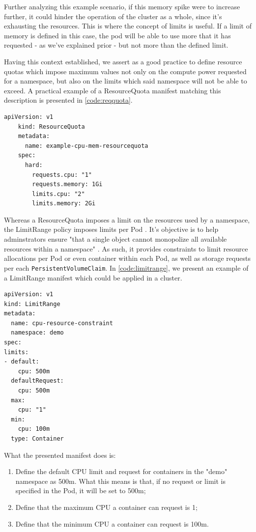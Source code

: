 \documentclass[a4paper,11pt,openright,BCOR=15mm]{scrbook}
\begin{document}
Further analyzing this example scenario, if this memory spike were to increase further, it could hinder the operation of the cluster as a whole, since it's exhausting the resources. This is where the concept of limits is useful. If a limit of memory is defined in this case, the pod will be able to use more that it has requested - as we've explained prior - but not more than the defined limit.

Having this context established, we assert as a good practice to define resource quotas which impose maximum values not only on the compute power requested for a namespace, but also on the limits which said namespace will not be able to exceed. A practical example of a ResourceQuota manifest matching this description is presented in \ref{code:reqquota}.

\begin{lstlisting}[style=yaml,caption={ResourceQuota example},label=code:reqquota]
	apiVersion: v1
	kind: ResourceQuota
	metadata:
	  name: example-cpu-mem-resourcequota
	spec:
	  hard:
	    requests.cpu: "1"
		requests.memory: 1Gi
		limits.cpu: "2"
		limits.memory: 2Gi
\end{lstlisting}


Whereas a ResourceQuota imposes a limit on the resources used by a namespace, the LimitRange policy imposes limits per Pod \cite{national_security_agency_kubernetes_2022}. It's objective is to help adminstrators ensure "that a single object cannot monopolize all available resources within a namespace" \cite{the_linux_foundation_limit_2024}. As such, it provides constraints to limit resource allocations per Pod or even container within each Pod, as well as storage requests per each \texttt{PersistentVolumeClaim}. In \ref{code:limitrange}, we present an example of a LimitRange manifest which could be applied in a cluster.


\begin{lstlisting}[style=yaml,caption={ResourceQuota example},label=code:limitrange]
apiVersion: v1
kind: LimitRange
metadata:
  name: cpu-resource-constraint
  namespace: demo
spec:
limits:
- default:
    cpu: 500m
  defaultRequest:
    cpu: 500m
  max:
    cpu: "1"
  min:
    cpu: 100m
  type: Container
\end{lstlisting}

What the presented manifest does is:
\begin{enumerate}
	\item Define the default CPU limit and request for containers in the "demo" namespace as 500m. What this means is that, if no request or limit is specified in the Pod, it will be set to 500m;
	\item Define that the maximum CPU a container can request is 1;
	\item Define that the minimum CPU a container can request is 100m.
\end{enumerate}
\end{document}
